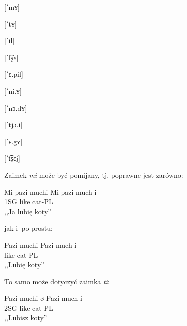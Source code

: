 \begin{spacing}{1.1}
\begin{multicols}{2}
[ˈmʏ]

[ˈtʏ]


[ˈil]

[ˈt͡ʂʏ]

[ˈɛ.pil]

[ˈni.ʏ]

[ˈnɔ.dʏ]

[ˈtjɔ.i]

[ˈɛ.gʏ]

[ˈt͡ʂɛj]

\end{multicols}

\noindent
Zaimek \emph{mi} może być pomijany, tj. poprawne jest zarówno: 

\begin{exe}
	\ex
	\trans Mi pazi muchi
	\gll  Mi pazi much-i \\
	  1SG like cat-PL \\
	\glt  ,,Ja lubię koty''
\end{exe}

jak i~po prostu:

\begin{exe}
	\ex
	\trans Pazi muchi
	\gll  Pazi much-i \\
	  like cat-PL \\
	\glt  ,,Lubię koty''
\end{exe}

To samo może dotyczyć zaimka \emph{ti}:

\begin{exe}
	\ex
	\trans Pazi muchi
	\gll ø Pazi much-i \\
	  2SG like cat-PL \\
	\glt  ,,Lubisz koty''
\end{exe}


\end{spacing}
